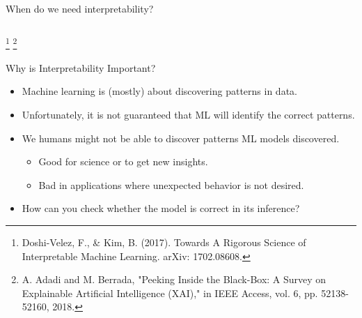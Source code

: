 \documentclass[11pt,compress,t,notes=noshow, aspectratio=169, xcolor=table]{beamer}
\begin{document}
\begin{frame}{When do we need interpretability?}
\begin{columns}[T]
\begin{column}{0.4\textwidth}
\end{column}
\end{columns}
     \lz
    \footnote[frame]{Doshi-Velez, F., \& Kim, B. (2017). Towards A Rigorous Science of Interpretable Machine Learning. arXiv: 1702.08608.}
    \footnote[frame]{A. Adadi and M. Berrada, "Peeking Inside the Black-Box: A Survey on Explainable Artificial Intelligence (XAI)," in IEEE Access, vol. 6, pp. 52138-52160, 2018.}
\end{frame}



\begin{frame}{Why is Interpretability Important?}
	
	\begin{itemize}
	    \item Machine learning is (mostly) about discovering patterns in data.
	    \medskip
	    \item Unfortunately, it is not guaranteed that ML will identify the correct patterns.
	    
	    \medskip
	    \item We humans might not be able to discover patterns ML models discovered.
	    \begin{itemize}
	        \item Good for science or to get new insights.
	        \item Bad in applications where unexpected behavior is not desired.
	    \end{itemize}
	    \medskip
	    
	    \item \alert{How can you check whether the model is correct in its inference?}
	\end{itemize}
	
\end{frame}
\end{document}

